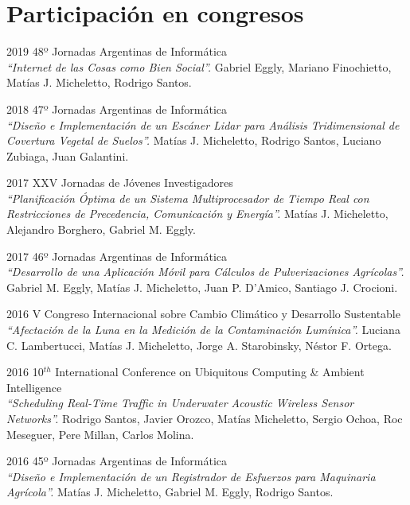 \documentclass[letterpaper]{twentysecondcv} %
\begin{document}
\section{Participación en congresos}

\begin{twenty}
\twentyitem
    {2019}
    {}
    {48º Jornadas Argentinas de Informática\\} 
    {\textit{``Internet de las Cosas como Bien Social''.}}
    {Gabriel Eggly, Mariano Finochietto, Matías J. Micheletto, Rodrigo Santos.}
    
\twentyitem
    {2018}
    {}
    {47º Jornadas Argentinas de Informática\\}
    {\textit{``Diseño e Implementación de un Escáner Lidar para Análisis Tridimensional de Covertura Vegetal de Suelos''.}}
    {Matías J. Micheletto, Rodrigo Santos, Luciano Zubiaga, Juan Galantini.}

\twentyitem
    {2017}
    {}
    {XXV Jornadas de Jóvenes Investigadores\\}
    {\textit{``Planificación Óptima de un Sistema Multiprocesador de Tiempo Real con Restricciones de Precedencia, Comunicación y Energía''.}}
    {Matías J. Micheletto, Alejandro Borghero, Gabriel M. Eggly.}
    
\twentyitem
    {2017}
    {}
    {46º Jornadas Argentinas de Informática\\}
    {\textit{``Desarrollo de una Aplicación Móvil para Cálculos de Pulverizaciones Agrícolas''.}}
    {Gabriel M. Eggly, Matías J. Micheletto, Juan P. D'Amico, Santiago J. Crocioni.}
    
\twentyitem
    {2016}
    {}
    {V Congreso Internacional sobre Cambio Climático y Desarrollo Sustentable\\}
    {\textit{``Afectación de la Luna en la Medición de la Contaminación Lumínica''.}}
    {Luciana C. Lambertucci, Matías J. Micheletto, Jorge A. Starobinsky, Néstor F. Ortega.}
    
\twentyitem
    {2016}
    {}
    {10$^{th}$ International Conference on Ubiquitous Computing \& Ambient Intelligence\\}
    {\textit{``Scheduling Real-Time Traffic in Underwater Acoustic Wireless Sensor Networks''.}}
    {Rodrigo Santos, Javier Orozco, Matías Micheletto, Sergio Ochoa, Roc Meseguer, Pere Millan, Carlos Molina.}
    
\twentyitem
    {2016}
    {}
    {45º Jornadas Argentinas de Informática\\}
    {\textit{``Diseño e Implementación de un Registrador de Esfuerzos para Maquinaria Agrícola''.}}
    {Matías J. Micheletto, Gabriel M. Eggly, Rodrigo Santos.}
    

\end{twenty}
\end{document}
